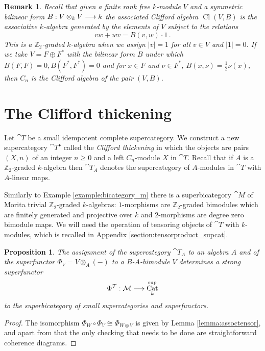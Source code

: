 \documentclass[english,letter paper,12pt,leqno]{article}
\newtheorem{proposition}[theorem]{Proposition}
\theoremstyle{example}
\newtheorem{remark}[theorem]{Remark}
\numberwithin{equation}{section}
\DeclareMathOperator{\Cat}{Cat}
\begin{document}
\begin{remark} Recall that given a finite rank free $k$-module $V$ and a symmetric bilinear form $B: V \otimes_k V \longrightarrow k$ the associated Clifford algebra $\operatorname{Cl}(V, B)$ is the associative $k$-algebra generated by the elements of $V$ subject to the relations
\[
vw + wv = B(v,w) \cdot 1\,.
\]
This is a $\mathbb{Z}_2$-graded $k$-algebra when we assign $|v| = 1$ for all $v \in V$ and $|1| = 0$. If we take $V = F \oplus F^*$ with the bilinear form $B$ under which $B(F,F) = 0, B(F^*, F^*) = 0$ and for $x \in F$ and $\nu \in F^*$, $B(x, \nu) = \frac{1}{2} \nu(x)$, then $C_n$ is the Clifford algebra of the pair $(V,B)$.
\end{remark}

\section{The Clifford thickening}

Let $\cat{T}$ be a small idempotent complete supercategory. We construct a new supercategory $\cat{T}^\bullet$ called the \emph{Clifford thickening} in which the objects are pairs $(X,n)$ of an integer $n \ge 0$ and a left $C_n$-module $X$ in $\cat{T}$. Recall that if $A$ is a $\mathbb{Z}_2$-graded $k$-algebra then $\cat{T}_A$ denotes the supercategory of $A$-modules in $\cat{T}$ with $A$-linear maps.


Similarly to Example \ref{example:bicategory_m} there is a superbicategory $\cat{M}$ of Morita trivial $\mathbb{Z}_2$-graded $k$-algebras: $1$-morphisms are $\mathbb{Z}_2$-graded bimodules which are finitely generated and projective over $k$ and $2$-morphisms are degree zero bimodule maps. We will need the operation of tensoring objects of $\cat{T}$ with $k$-modules, which is recalled in Appendix \ref{section:tensorproduct_supcat}. 

\begin{proposition} The assignment of the supercategory $\cat{T}_A$ to an algebra $A$ and of the superfunctor $\Phi_V = V \otimes_A (-)$ to a $B$-$A$-bimodule $V$ determines a strong superfunctor
\[
\Phi^{\cat{T}}: \cat{M} \lto \Cat^{\operatorname{sup}}_k
\]
to the superbicategory of small supercategories and superfunctors.
\end{proposition}
\begin{proof}
The isomorphism $\Phi_W \circ \Phi_V \cong \Phi_{W \otimes V}$ is given by Lemma \ref{lemma:assoctensor}, and apart from that the only checking that needs to be done are straightforward coherence diagrams.
\end{proof}
\end{document}
